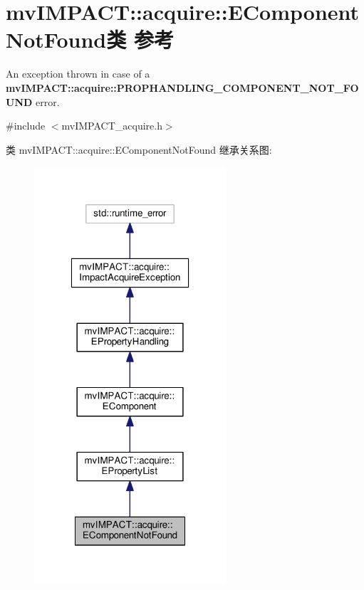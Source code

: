 \hypertarget{classmv_i_m_p_a_c_t_1_1acquire_1_1_e_component_not_found}{\section{mv\+I\+M\+P\+A\+C\+T\+:\+:acquire\+:\+:E\+Component\+Not\+Found类 参考}
\label{classmv_i_m_p_a_c_t_1_1acquire_1_1_e_component_not_found}
}


An exception thrown in case of a {\bfseries mv\+I\+M\+P\+A\+C\+T\+::acquire\+::\+P\+R\+O\+P\+H\+A\+N\+D\+L\+I\+N\+G\+\_\+\+C\+O\+M\+P\+O\+N\+E\+N\+T\+\_\+\+N\+O\+T\+\_\+\+F\+O\+U\+N\+D} error.  




{\ttfamily \#include $<$mv\+I\+M\+P\+A\+C\+T\+\_\+acquire.\+h$>$}



类 mv\+I\+M\+P\+A\+C\+T\+:\+:acquire\+:\+:E\+Component\+Not\+Found 继承关系图\+:
\nopagebreak
\begin{figure}[H]
\begin{center}
\leavevmode
\includegraphics[width=202pt]{classmv_i_m_p_a_c_t_1_1acquire_1_1_e_component_not_found__inherit__graph}
\end{center}
\end{figure}


